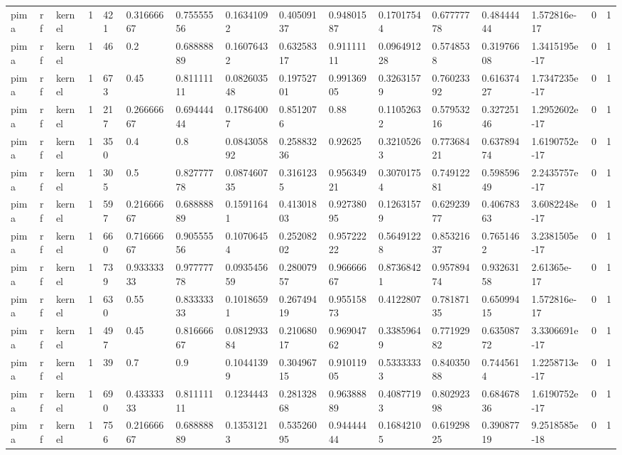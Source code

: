 \begin{tabular}{llllllllllllllll}
pima & rf & kernel & 1 & 421 & 0.31666667 & 0.75555556 & 0.16341092 & 0.40509137 & 0.94801587 & 0.17017544 & 0.67777778 & 0.48444444 & 1.572816e-17 & 0 & 1 \\
pima & rf & kernel & 1 & 46 & 0.2 & 0.68888889 & 0.16076432 & 0.63258317 & 0.91111111 & 0.096491228 & 0.5748538 & 0.31976608 & 1.3415195e-17 & 0 & 1 \\
pima & rf & kernel & 1 & 673 & 0.45 & 0.81111111 & 0.082603548 & 0.19752701 & 0.99136905 & 0.32631579 & 0.76023392 & 0.61637427 & 1.7347235e-17 & 0 & 1 \\
pima & rf & kernel & 1 & 217 & 0.26666667 & 0.69444444 & 0.17864007 & 0.8512076 & 0.88 & 0.11052632 & 0.57953216 & 0.32725146 & 1.2952602e-17 & 0 & 1 \\
pima & rf & kernel & 1 & 350 & 0.4 & 0.8 & 0.084305892 & 0.25883236 & 0.92625 & 0.32105263 & 0.77368421 & 0.63789474 & 1.6190752e-17 & 0 & 1 \\
pima & rf & kernel & 1 & 305 & 0.5 & 0.82777778 & 0.087460735 & 0.3161235 & 0.95634921 & 0.30701754 & 0.74912281 & 0.59859649 & 2.2435757e-17 & 0 & 1 \\
pima & rf & kernel & 1 & 597 & 0.21666667 & 0.68888889 & 0.15911641 & 0.41301803 & 0.92738095 & 0.12631579 & 0.62923977 & 0.40678363 & 3.6082248e-17 & 0 & 1 \\
pima & rf & kernel & 1 & 660 & 0.71666667 & 0.90555556 & 0.10706454 & 0.25208202 & 0.95722222 & 0.56491228 & 0.85321637 & 0.7651462 & 3.2381505e-17 & 0 & 1 \\
pima & rf & kernel & 1 & 739 & 0.93333333 & 0.97777778 & 0.093545659 & 0.28007957 & 0.96666667 & 0.87368421 & 0.95789474 & 0.93263158 & 2.61365e-17 & 0 & 1 \\
pima & rf & kernel & 1 & 630 & 0.55 & 0.83333333 & 0.10186591 & 0.26749419 & 0.95515873 & 0.4122807 & 0.78187135 & 0.65099415 & 1.572816e-17 & 0 & 1 \\
pima & rf & kernel & 1 & 497 & 0.45 & 0.81666667 & 0.081293384 & 0.21068017 & 0.96904762 & 0.33859649 & 0.77192982 & 0.63508772 & 3.3306691e-17 & 0 & 1 \\
pima & rf & kernel & 1 & 39 & 0.7 & 0.9 & 0.10441399 & 0.30496715 & 0.91011905 & 0.53333333 & 0.84035088 & 0.7445614 & 1.2258713e-17 & 0 & 1 \\
pima & rf & kernel & 1 & 690 & 0.43333333 & 0.81111111 & 0.1234443 & 0.28132868 & 0.96388889 & 0.40877193 & 0.80292398 & 0.68467836 & 1.6190752e-17 & 0 & 1 \\
pima & rf & kernel & 1 & 756 & 0.21666667 & 0.68888889 & 0.13531213 & 0.53526095 & 0.94444444 & 0.16842105 & 0.61929825 & 0.39087719 & 9.2518585e-18 & 0 & 1 \\

\end{tabular}
